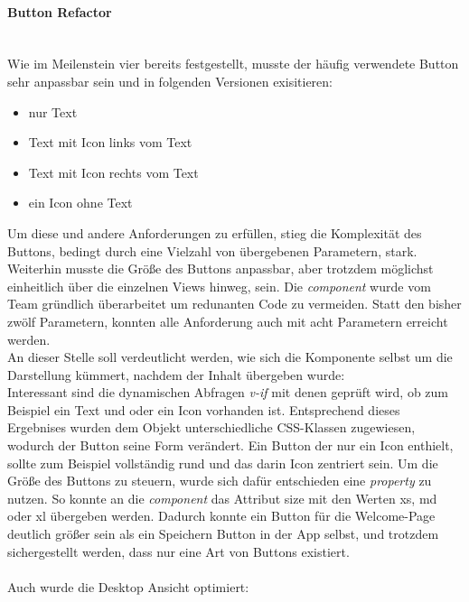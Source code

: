 \documentclass[10pt, a4paper]{article}
\begin{document}
\begin{onehalfspace}
\paragraph*{Button Refactor} $~$ \\
Wie im Meilenstein vier bereits festgestellt, musste der häufig verwendete Button sehr anpassbar sein und in folgenden Versionen exisitieren:
\begin{itemize}
  \item nur Text
  \item Text mit Icon links vom Text
  \item Text mit Icon rechts vom Text
  \item ein Icon ohne Text
\end{itemize}
Um diese und andere Anforderungen zu erfüllen, stieg die Komplexität des Buttons, bedingt durch eine Vielzahl von übergebenen Parametern, stark.
Weiterhin musste die Größe des Buttons anpassbar, aber trotzdem möglichst einheitlich über die einzelnen Views hinweg, sein. Die \textit{component} wurde vom Team gründlich überarbeitet um redunanten Code zu vermeiden. Statt den bisher zwölf Parametern, konnten alle Anforderung auch mit acht Parametern erreicht werden.
\\
An dieser Stelle soll verdeutlicht werden, wie sich die Komponente selbst um die Darstellung kümmert, nachdem der Inhalt übergeben wurde: \\
  \label{fig:HomeVueSchema}
Interessant sind die dynamischen Abfragen \textit{v-if} mit denen geprüft wird, ob zum Beispiel ein Text und oder ein Icon vorhanden ist. Entsprechend dieses Ergebnises wurden dem Objekt unterschiedliche CSS-Klassen zugewiesen, wodurch der Button seine Form verändert.
Ein Button der nur ein Icon enthielt, sollte zum Beispiel vollständig rund und das darin Icon zentriert sein.
Um die Größe des Buttons zu steuern, wurde sich dafür entschieden eine \textit{property} zu nutzen. So konnte an die \textit{component} das Attribut \glqq size\grqq{} mit den Werten \glqq xs\grqq , \glqq md\grqq{} oder \glqq xl\grqq{} übergeben werden.
Dadurch konnte ein Button für die Welcome-Page deutlich größer sein als ein Speichern Button in der App selbst, und trotzdem sichergestellt werden, dass nur eine Art von Buttons existiert.
\\~\\
Auch wurde die Desktop Ansicht optimiert:\\


\end{onehalfspace}
\end{document}
